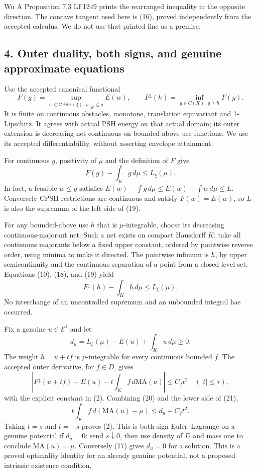 \documentclass[
  10pt,
]{article}
\begin{document}
Wu A Proposition 7.3 LF1249 prints the rearranged inequality in the
opposite direction. The concave tangent used here is (16), proved
independently from the accepted calculus. We do not use that printed
line as a premise.

\subsection{4. Outer duality, both signs, and genuine approximate
equations}\label{outer-duality-both-signs-and-genuine-approximate-equations}

Use the accepted canonical functional \[
 F(g)=\sup_{w\in\mathrm{CPSH}(\xi),\ w|_K\leq g}E(w),\qquad
 F^\downarrow(h)=\inf_{g\in C(K),\ g\geq h}F(g).                        \tag{18}
\] It is finite on continuous obstacles, monotone, translation
equivariant and 1-Lipschitz. It agrees with actual PSH energy on that
actual domain; its outer extension is decreasing-net continuous on
bounded-above usc functions. We use its accepted differentiability,
without asserting envelope attainment.

For continuous \(g\), positivity of \(\mu\) and the definition of \(F\)
give \[
          F(g)-\int_Kg\,d\mu\leq L_\xi(\mu).                         \tag{19}
\] In fact, a feasible \(w\leq g\) satisfies
\(E(w)-\int g\,d\mu\leq E(w)-\int w\,d\mu\leq L\). Conversely CPSH
restrictions are continuous and satisfy \(F(w)=E(w)\), so \(L\) is also
the supremum of the left side of (19).

For any bounded-above usc \(h\) that is \(\mu\)-integrable, choose its
decreasing continuous-majorant net. Such a net exists on compact
Hausdorff \(K\): take all continuous majorants below a fixed upper
constant, ordered by pointwise reverse order, using minima to make it
directed. The pointwise infimum is \(h\), by upper semicontinuity and
the continuous separation of a point from a closed level set. Equations
(10), (18), and (19) yield \[
          F^\downarrow(h)-\int_Kh\,d\mu\leq L_\xi(\mu).               \tag{20}
\] No interchange of an uncontrolled supremum and an unbounded integral
has occurred.

Fix a genuine \(u\in\mathcal E^1\) and let \[
 d_u=L_\xi(\mu)-E(u)+\int_Ku\,d\mu\geq0.
\] The weight \(h=u+tf\) is \(\mu\)-integrable for every continuous
bounded \(f\). The accepted outer derivative, for \(f\in D\), gives \[
 \left|F^\downarrow(u+tf)-E(u)-t\int_Kf\,d\mathrm{MA}(u)\right|
   \leq C_f t^2\quad(|t|\leq\tau),                                  \tag{21}
\] with the explicit constant in (2). Combining (20) and the lower side
of (21), \[
 t\int_Kf\,d(\mathrm{MA}(u)-\mu)\leq d_u+C_f t^2.
\] Taking \(t=s\) and \(t=-s\) proves (2). This is both-sign
Euler--Lagrange on a genuine potential if \(d_u=0\): send
\(s\downarrow0\), then use density of \(D\) and mass one to conclude
\(\mathrm{MA}(u)=\mu\). Conversely (17) gives \(d_u=0\) for a solution.
This is a proved optimality identity for an already genuine potential,
not a proposed intrinsic existence condition.
\end{document}
